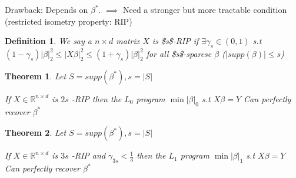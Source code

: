 \documentclass[11pt]{article}
\newtheorem{theorem}{Theorem}
\newtheorem{definition}{Definition}
\begin{document}
Drawback: Depends on \(\beta^*\).
\(\implies\) Need a stronger but more tractable condition (restricted isometry property: RIP)

\begin{definition}
We say a \(n \times d\) matrix \(X\) is \$s\$-RIP if \(\exists \gamma_s \in (0, 1)\) s.t
\((1 - \gamma_s) |\beta|_2^2 \le |X\beta|_2^2 \le (1+\gamma_s)|\beta|_2^2\) for all \$s\$-sparese \(\beta\) (\(|supp(\beta)| \le s\)) 
\label{orgspecialblock3}

\end{definition}

\begin{theorem}
Let \(S = supp(\beta^*), s = |S|\)

If \(X \in \mathbb{R}^{n \times d}\) is \(2s\) -RIP then the \(L_0\) program \(\min |\beta|_0\) s.t \(X\beta = Y\) Can perfectly recover \(\beta^*\)
\label{orgspecialblock4}

\end{theorem}

\begin{theorem}
Let \(S = supp(\beta^*), s = |S|\)

If \(X \in \mathbb{R}^{n \times d}\) is \(3s\) -RIP and \(\gamma_{3s} < \frac13\) then the \(L_1\) program \(\min |\beta|_1\) s.t \(X\beta = Y\) Can perfectly recover \(\beta^*\)
\label{orgspecialblock5}

\end{theorem}
\end{document}
